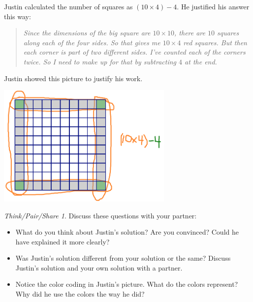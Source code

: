 \documentclass[12pt, reqno]{amsart}
\theoremstyle{remark}
\newtheorem*{thinkpair*}{Think/Pair/Share}
\theoremstyle{definition}
\numberwithin{equation}{section}  %
\begin{document}
\bigskip

\newpage

Justin calculated the number of squares as $(10 \times 4) - 4$.  He justified his answer this way:
\begin{quotation}
\emph{Since the dimensions of the big square are $10 \times 10$, there are $10$ squares along each of the four sides.  So that gives me $10 \times 4$ red squares.  But then each corner is part of two different sides.  I've counted each of the corners twice.  So I need to make up for that by subtracting $4$ at the end.}
\end{quotation}

Justin showed this picture to justify his work.
\begin{center}
\includegraphics[height=6cm]{border2}
\end{center}

\bigskip
\bigskip


\begin{thinkpair*}
Discuss these questions with your partner:
\begin{itemize}
\item
What do you think about Justin's solution?  Are you convinced?  Could he have explained it more clearly?\\

\item
Was Justin's solution different from your solution or the same?  Discuss Justin's solution and your own solution with a partner.\\

\item
Notice the color coding in Justin's picture.  What do the colors represent?  Why did he use the colors the way he did?\\
\end{itemize}
\end{thinkpair*}

\newpage
\end{document}
